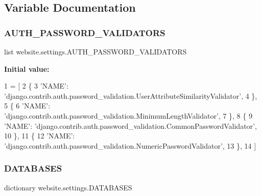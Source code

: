 \subsection{Variable Documentation}
\mbox{\label{namespacewebsite_1_1settings_ad4b81bc9f3910fe308ee93d84ba10e80}} 
\subsubsection{\texorpdfstring{A\+U\+T\+H\+\_\+\+P\+A\+S\+S\+W\+O\+R\+D\+\_\+\+V\+A\+L\+I\+D\+A\+T\+O\+RS}{AUTH\_PASSWORD\_VALIDATORS}}
{\footnotesize\ttfamily list website.\+settings.\+A\+U\+T\+H\+\_\+\+P\+A\+S\+S\+W\+O\+R\+D\+\_\+\+V\+A\+L\+I\+D\+A\+T\+O\+RS}

{\bfseries Initial value\+:}
\begin{DoxyCode}
1 =  [
2     \{
3         \textcolor{stringliteral}{'NAME'}: \textcolor{stringliteral}{'django.contrib.auth.password\_validation.UserAttributeSimilarityValidator'},
4     \},
5     \{
6         \textcolor{stringliteral}{'NAME'}: \textcolor{stringliteral}{'django.contrib.auth.password\_validation.MinimumLengthValidator'},
7     \},
8     \{
9         \textcolor{stringliteral}{'NAME'}: \textcolor{stringliteral}{'django.contrib.auth.password\_validation.CommonPasswordValidator'},
10     \},
11     \{
12         \textcolor{stringliteral}{'NAME'}: \textcolor{stringliteral}{'django.contrib.auth.password\_validation.NumericPasswordValidator'},
13     \},
14 ]
\end{DoxyCode}
\mbox{\label{namespacewebsite_1_1settings_a8f0017138d0838d1812bfe0bcc81e18d}} 
\subsubsection{\texorpdfstring{D\+A\+T\+A\+B\+A\+S\+ES}{DATABASES}}
{\footnotesize\ttfamily dictionary website.\+settings.\+D\+A\+T\+A\+B\+A\+S\+ES}

